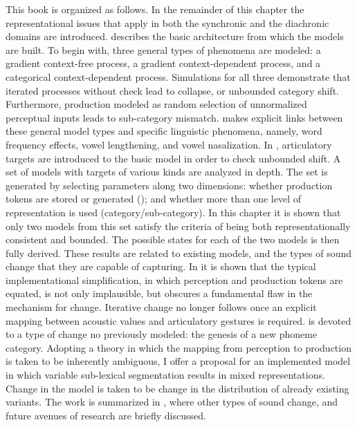 This book is organized as follows. In the remainder of this chapter
the representational issues that apply in both the synchronic and
the diachronic domains are introduced. 
describes the basic architecture from which the models are built.
To begin with, three general types of phenomena are modeled: a gradient
context-free process, a gradient context-dependent process, and a
categorical context-dependent process. Simulations for all three demonstrate
that iterated processes without check lead to collapse, or unbounded
category shift. Furthermore, production modeled as random selection
of unnormalized perceptual inputs leads to sub-category mismatch.
 makes explicit links
between these general model types and specific linguistic phenomena,
namely, word frequency effects, vowel lengthening, and vowel nasalization.
In , articulatory targets are introduced
to the basic model in order to check unbounded shift. A set of models
with targets of various kinds are analyzed in depth. The set is generated
by selecting parameters along two dimensions: whether production tokens
are stored or generated (); and whether more than
one level of representation is used (category/sub-category). In this
chapter it is shown that only two models from this set satisfy the
criteria of being both representationally consistent and bounded.
The possible states for each of the two models is then fully derived.
These results are related to existing models, and the types of sound
change that they are capable of capturing. In 
it is shown that the typical implementational simplification, in which
perception and production tokens are equated, is not only implausible,
but obscures a fundamental flaw in the mechanism for change. Iterative
change no longer follows once an explicit mapping between acoustic
values and articulatory gestures is required. 
is devoted to a type of change no previously modeled: the genesis
of a new phoneme category. Adopting a theory in which the mapping
from perception to production is taken to be inherently ambiguous,
I offer a proposal for an implemented model in which variable sub-lexical
segmentation results in mixed representations. Change in the model
is taken to be change in the distribution of already existing variants.
The work is summarized in ,
where other types of sound change, and future avenues of research
are briefly discussed. 


